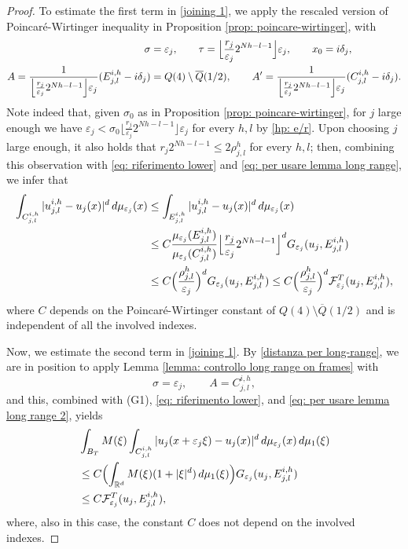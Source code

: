 \documentclass{article}
\theoremstyle{plain}
\theoremstyle{definition}
\def\rr{{\mathbb R}}
\newcommand{\ej}{\varepsilon_j}
\newcommand{\rj}{r_j}
\newcommand{\s}{\sigma}
\newcommand{\dej}{\delta_j}
\newcommand{\A}{\mathcal{A}}
\newcommand{\F}{\mathcal{F}}
\newcommand{\Q}
{\overline{Q}}
\numberwithin{equation}{section}
\begin{document}
\begin{proof}
To estimate the first term in \eqref{joining 1}, we apply the rescaled version of Poincaré-Wirtinger inequality in Proposition \ref{prop: poincare-wirtinger}, with
\begin{equation*}
\begin{split}
    \sigma &=\ej,  \qquad \tau =\Bigl\lfloor\frac{\rj}{\varepsilon_{j}}2^{Nh-l-1}\Bigr\rfloor\ej, \qquad x_0=i\dej, \\A=\frac{1}{\Bigl\lfloor\frac{\rj}{\varepsilon_{j}}2^{Nh-l-1}\Bigr\rfloor\ej}(E^{i,h}_{j,l}-i\dej)&=Q(4)\setminus \Q(1/2), \qquad A' = \frac{1}{\Bigl\lfloor\frac{\rj}{\varepsilon_{j}}2^{Nh-l-1}\Bigr\rfloor\ej}(C^{i,h}_{j,l}-i\dej).
\end{split}
\end{equation*}
Note indeed that, given $\s_0$ as in Proposition \ref{prop: poincare-wirtinger}, for $j$ large enough we have $\ej<\sigma_0\bigl\lfloor\frac{\rj}{\varepsilon_{j}}2^{Nh-l-1}\bigr\rfloor\ej$ for every $h,l$ by \eqref{hp: e/r}. Upon choosing $j$ large enough, it also holds that $\rj2^{Nh-l-1}\leq 2\rho^{h}_{j,l}$ for every $h,l$; then, combining this observation with \eqref{eq: riferimento lower} and \eqref{eq: per usare lemma long range}, we infer that
\begin{align}\notag
        \int_{ C^{i, h}_{j,l}}|u_{j,l}^{i,h}-u_j(x)|^d\,d\mu_{\ej}(x) & \leq  \int_{ E^{i, h}_{j,l}}|u_{j,l}^{i,h}-u_j(x)|^d\,d\mu_{\ej}(x) \\ \notag
        & \leq C \frac{\mu_{\ej}(E^{i,h}_{j,l})}{\mu_{\ej}(C^{i,h}_{j,l})}\Bigl\lfloor\frac{\rj}{\varepsilon_{j}}2^{Nh-l-1}\Bigr\rfloor^dG_{\ej}(u_j, E^{i, h}_{j,l}) \\ \label{joining poincare bis}
        & \leq C \Bigl(\frac{\rho^h_{j,l}}{\ej}\Bigr)^dG_{\ej}(u_j, E^{i, h}_{j,l})\leq C\Bigl(\frac{\rho^h_{j,l}}{\ej}\Bigr)^d\F^T_{\ej}(u_j,E^{i, h}_{j,l}),
        \end{align}
where $C$ depends on the Poincaré-Wirtinger constant of $Q(4)\setminus \Q(1/2)$ and is independent of all the involved indexes.



Now, we estimate the second term in \eqref{joining 1}. By \eqref{distanza per long-range}, we are in position to apply Lemma \ref{lemma: controllo long range on frames} with 
\begin{equation*}
    \sigma =\ej,  \qquad A=C^{i,h}_{j,l},
\end{equation*}
and this, combined with (G1), \eqref{eq: riferimento lower}, and \eqref{eq: per usare lemma long range 2}, yields
\begin{align}\notag
  & \int_{ B_T}M(\xi)\int_{C^{i, h}_{j,l}}|u_{j}(x+\ej\xi)-u_{j}(x)|^d\, d\mu_{\ej}(x)\, d\mu_1(\xi) \\ \notag
   &\leq C\Bigl(\int_{\rr^d}M(\xi)(1+|\xi|^{d})\, d\mu_1(\xi)\Bigr)G_{\ej}(u_j, E^{i, h}_{j,l})\\ \label{joining 1.5}
   &\leq C\F^T_{\ej}(u_j,E^{i, h}_{j,l}),
\end{align}
where, also in this case, the constant $C$ does not depend on the involved indexes.


\end{proof}
\end{document}
